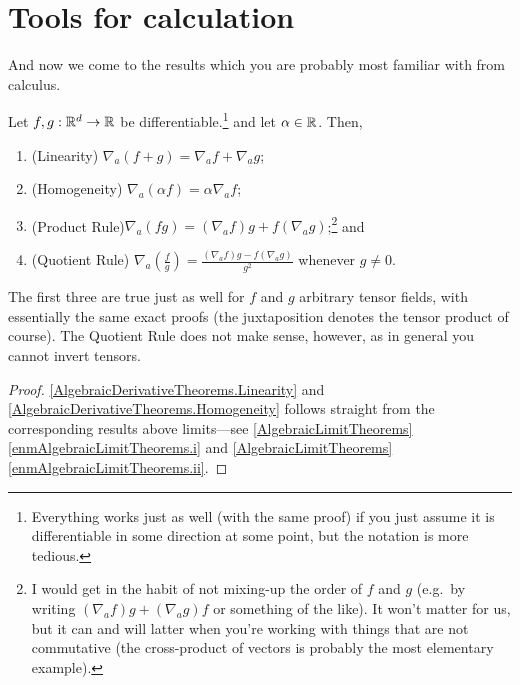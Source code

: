 \section{Tools for calculation}

And now we come to the results which you are probably most familiar with from calculus.
\begin{prp}\label{AlgebraicDerivativeTheorems}
Let $f,g:\mathbb{R} ^d\rightarrow \mathbb{R}$ be differentiable.\footnote{Everything works just as well (with the same proof) if you just assume it is differentiable in some direction at some point, but the notation is more tedious.} and let $\alpha \in \mathbb{R}$.  Then,
\begin{enumerate}
\item \label{AlgebraicDerivativeTheorems.Linearity}(Linearity) $\nabla _a(f+g)=\nabla _af+\nabla _ag$;
\item \label{AlgebraicDerivativeTheorems.Homogeneity}(Homogeneity) $\nabla _a(\alpha f)=\alpha \nabla _af$;
\item \label{AlgebraicDerivativeTheorems.ProductRule}(Product Rule)$\nabla _a(fg)=(\nabla _af)g+f(\nabla _ag)$;\footnote{I would get in the habit of not mixing-up the order of $f$ and $g$ (e.g.~by writing $(\nabla _af)g+(\nabla _ag)f$ or something of the like).  It won't matter for us, but it can and will latter when you're working with things that are not commutative (the cross-product of vectors is probably the most elementary example).} and
\item \label{AlgebraicDerivativeTheorems.QuotientRule}(Quotient Rule) $\nabla _a\left( \frac{f}{g}\right) =\frac{(\nabla _af)g-f(\nabla _ag)}{g^2}$ whenever $g\neq 0$.
\end{enumerate}
\begin{rmk}
The first three are true just as well for $f$ and $g$ arbitrary tensor fields, with essentially the same exact proofs (the juxtaposition denotes the tensor product of course).  The Quotient Rule does not make sense, however, as in general you cannot invert tensors.
\end{rmk}
\begin{proof}
\ref{AlgebraicDerivativeTheorems.Linearity} and \ref{AlgebraicDerivativeTheorems.Homogeneity} follows straight from the corresponding results above limits---see \cref{AlgebraicLimitTheorems}\ref{enmAlgebraicLimitTheorems.i} and \cref{AlgebraicLimitTheorems}\ref{enmAlgebraicLimitTheorems.ii}.


\end{proof}
\end{prp}
